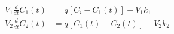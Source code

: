 \begin{equation}
  \begin{aligned}
    V_1 \frac{d}{dt}C_1(t) & = q [C_i - C_1(t)] - V_1 k_1
    \\
    V_2 \frac{d}{dt}C_2(t) & = q [C_1(t) - C_2(t)] - V_2 k_2
  \end{aligned}
  \label{eq:two_stirred_tank01_1}
\end{equation}